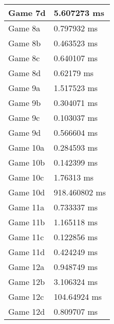 \begin{tabular}{|l|l|}
	Game 7d & 5.607273 ms \\ \hline
	Game 8a & 0.797932 ms \\ \hline
	Game 8b & 0.463523 ms \\ \hline
	Game 8c & 0.640107 ms \\ \hline
	Game 8d & 0.62179 ms \\ \hline
	Game 9a & 1.517523 ms \\ \hline
	Game 9b & 0.304071 ms \\ \hline
	Game 9c & 0.103037 ms \\ \hline
	Game 9d & 0.566604 ms \\ \hline
	Game 10a & 0.284593 ms \\ \hline
	Game 10b & 0.142399 ms \\ \hline
	Game 10c & 1.76313 ms \\ \hline
	Game 10d & 918.460802 ms \\ \hline
	Game 11a & 0.733337 ms \\ \hline
	Game 11b & 1.165118 ms \\ \hline
	Game 11c & 0.122856 ms \\ \hline
	Game 11d & 0.424249 ms \\ \hline
	Game 12a & 0.948749 ms \\ \hline
	Game 12b & 3.106324 ms \\ \hline
	Game 12c & 104.64924 ms \\ \hline
	Game 12d & 0.809707 ms \\ \hline
\end{tabular}